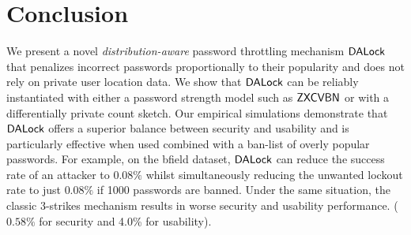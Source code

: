 \vspace*{-\baselineskip}
\section{Conclusion}
\vspace*{-\baselineskip}
We present a novel {\em distribution-aware} password throttling mechanism $\mathsf{DALock}$ that penalizes incorrect passwords proportionally to their popularity and does not rely on private user location data. We show that $\mathsf{DALock}$ can be reliably instantiated with either a password strength model such as $\mathsf{ZXCVBN}$ or with a differentially private count sketch. Our empirical simulations demonstrate that $\mathsf{DALock}$ offers a superior balance between security and usability and is particularly effective when used combined with a ban-list of overly popular passwords. For example, on the bfield dataset, $\mathsf{DALock}$ can reduce the success rate of an attacker to $0.08\%$ whilst simultaneously reducing the unwanted lockout rate to just $0.08\%$ if 1000 passwords are banned. Under the same situation, the classic 3-strikes mechanism results in worse security and usability performance. ($0.58\%$ for security and 4.0\% for usability).

